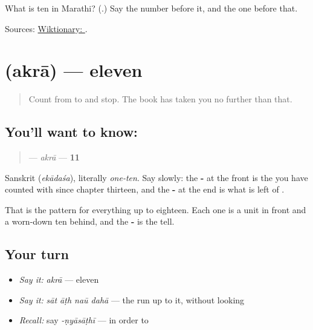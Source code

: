 \begin{tcolorbox}[breakable,colback=teal!4,colframe=teal!35!black,title={Before you move on}]
What is ten in Marathi? (\textbf{}.) Say the number before it, and the one before that.

Sources: \href{https://en.wiktionary.org/wiki/\%E0\%A4\%A6\%E0\%A4\%B9\%E0\%A4\%BE}{Wiktionary: }.
\end{tcolorbox}
\section[\texorpdfstring{\mr{अकरा} (akrā)}{अकरा (akrā)}]{ (akrā) — eleven}

\label{lesson:MR-C56-akra}



\begin{quote}
Count from \textbf{} to \textbf{} and stop. The book has taken you no further than that.
\end{quote}

\subsection*{You'll want to know: }
\begin{quote}
\textbf{} — \emph{akrā} — \textbf{11}
\end{quote}

Sanskrit \textbf{} (\emph{ekādaśa}), literally \emph{one-ten}. Say \textbf{} slowly: the \textbf{-} at the front is the \textbf{} you have counted with since chapter thirteen, and the \textbf{-} at the end is what is left of \textbf{}.

That is the pattern for everything up to eighteen. Each one is a unit in front and a worn-down ten behind, and the \textbf{-} is the tell.

\subsection*{Your turn}
\begin{itemize}
\raggedright
  \item \emph{Say it:} \emph{akrā} — eleven
  \item \emph{Say it:} \emph{sāt āṭh naū dahā} — the run up to it, without looking
  \item \emph{Recall:} say \emph{-ṇyāsāṭhī} — in order to
\end{itemize}

